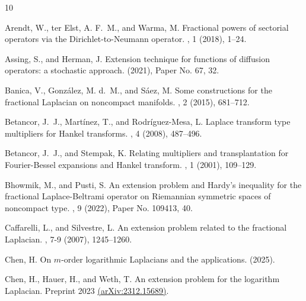 \documentclass[a4paper,10pt, reqno]{amsart}
\theoremstyle{definition}
\theoremstyle{remark}
\numberwithin{equation}{section}
\begin{document}

\def\cprime{$'$} \def\ocirc#1{\ifmmode\setbox0=\hbox{$#1$}\dimen0=\ht0 \advance\dimen0 by1pt\rlap{\hbox to\wd0{\hss\raise\dimen0 \hbox{\hskip.2em$\scriptscriptstyle\circ$}\hss}}#1\else {\accent"17 #1}\fi}
\begin{thebibliography}{10}

{\sc Arendt, W., ter Elst, A. F.~M., and Warma, M.}
\newblock Fractional powers of sectorial operators via the {D}irichlet-to-{N}eumann operator.
, 1 (2018), 1--24.

{\sc Assing, S., and Herman, J.}
\newblock Extension technique for functions of diffusion operators: a stochastic approach.
 (2021), Paper No. 67, 32.

{\sc Banica, V., Gonz\'alez, M. d.~M., and S\'aez, M.}
\newblock Some constructions for the fractional {L}aplacian on noncompact manifolds.
, 2 (2015), 681--712.

{\sc Betancor, J.~J., Mart\'inez, T., and Rodr\'iguez-Mesa, L.}
\newblock Laplace transform type multipliers for {H}ankel transforms.
, 4 (2008), 487--496.

{\sc Betancor, J.~J., and Stempak, K.}
\newblock Relating multipliers and transplantation for {F}ourier-{B}essel expansions and {H}ankel transform.
, 1 (2001), 109--129.

{\sc Bhowmik, M., and Pusti, S.}
\newblock An extension problem and {H}ardy's inequality for the fractional {L}aplace-{B}eltrami operator on {R}iemannian symmetric spaces of noncompact type.
, 9 (2022), Paper No. 109413, 40.

{\sc Caffarelli, L., and Silvestre, L.}
\newblock An extension problem related to the fractional {L}aplacian.
, 7-9 (2007), 1245--1260.

{\sc Chen, H.}
\newblock On $m$-order logarithmic {L}aplacians and the applications.
 (2025).

{\sc Chen, H., Hauer, H., and Weth, T.}
\newblock An extension problem for the logarithm {L}aplacian.
\newblock Preprint 2023 \href{http://arxiv.org/abs/2312.15689}{(arXiv:2312.15689)}.


\end{thebibliography}
\end{document}
